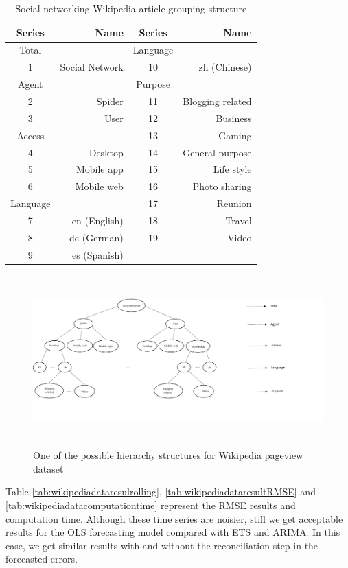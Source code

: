 \documentclass[11pt,a4paper,]{article}
\begin{document}
\begin{table}[t]

\caption{\label{tab:wikipediagroupingstructure}Social networking Wikipedia article grouping structure}
\centering
\begin{tabular}{crcr}
\toprule
Series & Name & Series & Name\\
\midrule
Total &  & Language & \\
1 & Social Network & 10 & zh (Chinese)\\
Agent &  & Purpose & \\
2 & Spider & 11 & Blogging related\\
3 & User & 12 & Business\\
Access &  & 13 & Gaming\\
4 & Desktop & 14 & General purpose\\
5 & Mobile app & 15 & Life style\\
6 & Mobile web & 16 & Photo sharing\\
Language &  & 17 & Reunion\\
7 & en (English) & 18 & Travel\\
8 & de (German) & 19 & Video\\
9 & es (Spanish) &  & \\
\bottomrule
\end{tabular}
\end{table}

\begin{figure}

{\centering \includegraphics[width=500px,height=250px]{Paper-Figures/Wiki_group_structure} 

}

\caption{One of the possible hierarchy structures for Wikipedia pageview dataset}\label{fig:wikigroupstructure}
\end{figure}

Table \ref{tab:wikipediadataresulrolling},
\ref{tab:wikipediadataresultRMSE} and
\ref{tab:wikipediadatacomputationtime} represent the RMSE results and
computation time. Although these time series are noisier, still we get
acceptable results for the OLS forecasting model compared with ETS and
ARIMA. In this case, we get similar results with and without the
reconciliation step in the forecasted errors.
\end{document}

